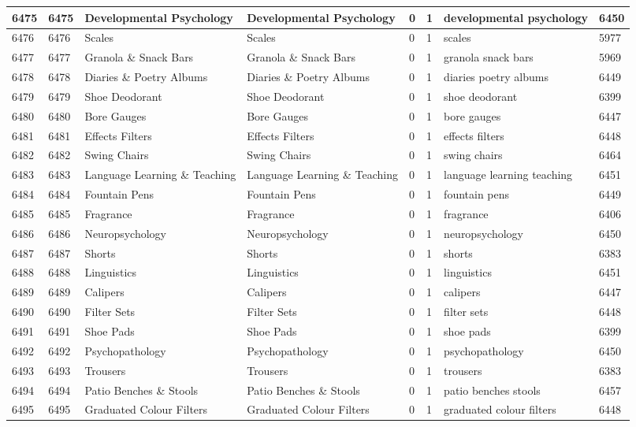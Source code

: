 \begin{longtable}{|l|l|l|l|l|l|l|l|}
6475 & 6475 & Developmental Psychology & Developmental Psychology & 0 & 1 & developmental psychology & 6450 \\ \hline 
6476 & 6476 & Scales & Scales & 0 & 1 & scales & 5977 \\ \hline 
6477 & 6477 & Granola \& Snack Bars & Granola \& Snack Bars & 0 & 1 & granola snack bars & 5969 \\ \hline 
6478 & 6478 & Diaries \& Poetry Albums & Diaries \& Poetry Albums & 0 & 1 & diaries poetry albums & 6449 \\ \hline 
6479 & 6479 & Shoe Deodorant & Shoe Deodorant & 0 & 1 & shoe deodorant & 6399 \\ \hline 
6480 & 6480 & Bore Gauges & Bore Gauges & 0 & 1 & bore gauges & 6447 \\ \hline 
6481 & 6481 & Effects Filters & Effects Filters & 0 & 1 & effects filters & 6448 \\ \hline 
6482 & 6482 & Swing Chairs & Swing Chairs & 0 & 1 & swing chairs & 6464 \\ \hline 
6483 & 6483 & Language Learning \& Teaching & Language Learning \& Teaching & 0 & 1 & language learning teaching & 6451 \\ \hline 
6484 & 6484 & Fountain Pens & Fountain Pens & 0 & 1 & fountain pens & 6449 \\ \hline 
6485 & 6485 & Fragrance & Fragrance & 0 & 1 & fragrance & 6406 \\ \hline 
6486 & 6486 & Neuropsychology & Neuropsychology & 0 & 1 & neuropsychology & 6450 \\ \hline 
6487 & 6487 & Shorts & Shorts & 0 & 1 & shorts & 6383 \\ \hline 
6488 & 6488 & Linguistics & Linguistics & 0 & 1 & linguistics & 6451 \\ \hline 
6489 & 6489 & Calipers & Calipers & 0 & 1 & calipers & 6447 \\ \hline 
6490 & 6490 & Filter Sets & Filter Sets & 0 & 1 & filter sets & 6448 \\ \hline 
6491 & 6491 & Shoe Pads & Shoe Pads & 0 & 1 & shoe pads & 6399 \\ \hline 
6492 & 6492 & Psychopathology & Psychopathology & 0 & 1 & psychopathology & 6450 \\ \hline 
6493 & 6493 & Trousers & Trousers & 0 & 1 & trousers & 6383 \\ \hline 
6494 & 6494 & Patio Benches \& Stools & Patio Benches \& Stools & 0 & 1 & patio benches stools & 6457 \\ \hline 
6495 & 6495 & Graduated Colour Filters & Graduated Colour Filters & 0 & 1 & graduated colour filters & 6448 \\ \hline 

\end{longtable}
